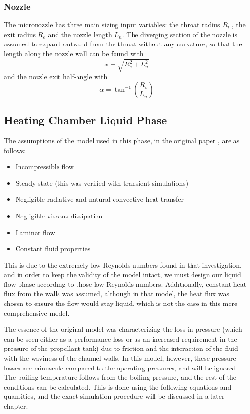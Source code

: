 \documentclass{homework}
\begin{document}
\begin{multicols}{2}
\subsubsection{Nozzle}
	  The micronozzle has three main sizing input variables: the throat radius $R_t$ , the exit radius $R_e$ and the nozzle length $L_n$. The diverging section of the nozzle is assumed to expand outward from the throat without any curvature, so that the length along the nozzle wall can be found with $$ x = \sqrt{R_{e}^2 + L_{n}^2} $$ and the nozzle exit half-angle with $$ \alpha = \tan^{-1} \left( \frac{R_{e}}{L_n} \right) $$
   
\subsection{Heating Chamber Liquid Phase}

The assumptions of the model used in this phase, in the original paper \cite{bianchi_micropropulsion_nodate}, are as follows:
\begin{itemize}
    \item Incompressible flow
    \item Steady state (this was verified with transient simulations)
    \item Negligible radiative and natural convective heat transfer
    \item Negligible viscous dissipation
    \item Laminar flow
    \item Constant fluid properties
\end{itemize}

	  This is due to the extremely low Reynolds numbers found in that investigation, and in order to keep the validity of the model intact, we must design our liquid flow phase according to those low Reynolds numbers. Additionally, constant heat flux from the walls was assumed, although in that model, the heat flux was chosen to ensure the flow would stay liquid, which is not the case in this more comprehensive model.  
   
The essence of the original model was characterizing the loss in pressure (which can be seen either as a performance loss or as an increased requirement in the pressure of the propellant tank) due to friction and the interaction of the fluid with the waviness of the channel walls. In this model, however, these pressure losses are minuscule compared to the operating pressures, and will be ignored. The boiling temperature follows from the boiling pressure, and the rest of the conditions can be calculated. This is done using the following equations and quantities, and the exact simulation procedure will be discussed in a later chapter.


\end{multicols}
\end{document}
